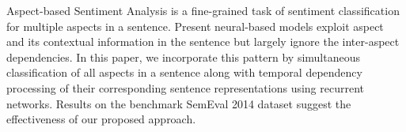 Aspect-based Sentiment Analysis is a fine-grained task of sentiment classification for multiple aspects in a sentence. Present neural-based models exploit aspect and its contextual information in the sentence but largely ignore the inter-aspect dependencies. In this paper, we incorporate this pattern by simultaneous classification of all aspects in a sentence along with temporal dependency processing of their corresponding sentence representations using recurrent networks. Results on the benchmark SemEval 2014 dataset suggest the effectiveness of our proposed approach.
